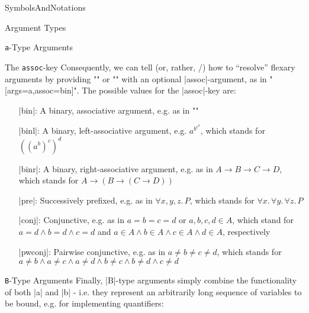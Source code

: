 \begin{smodule}[ns=https://github.com/slatex/sTeX/doc]{SymbolsAndNotations}
\begin{sfragment}{Argument Types}
\begin{sfragment}{\texttt a-Type Arguments}
\begin{sfragment}{The \texttt{assoc}-key}
            Consequently, we can tell \sTeX (or, rather, \mmt/\omdoc)
            how to ``resolve'' flexary arguments by providing
            \stexcode"\symdecl" or \stexcode"\symdef" with
            an optional |assoc|-argument, as in
            \stexcode"[args=a,assoc=bin]".
            The possible values for the |assoc|-key are:
            \begin{itemize}
                \item[|bin|:] A binary, associative argument, e.g.
                    as in \stexcode"\addition"
                \item[|binl|:] A binary, left-associative argument, e.g.
                    $a^{\scriptstyle b^{\scriptstyle c^d}}$, which stands for $((a^b)^c)^d$
                \item[|binr|:] A binary, right-associative argument,
                    e.g. as in $A\to B\to C\to D$, which stands
                    for $A \to (B \to (C \to D))$
                \item[|pre|:] Successively prefixed, e.g. as in
                    $\forall x,y,z.\,P$, which stands for
                    $\forall x.\, \forall y.\, \forall z.\,P$
                \item[|conj|:] Conjunctive, e.g. as in
                    $a=b=c=d$ or $a,b,c,d\in A$, which stand for
                    $a=d\wedge b=d\wedge c=d$ and $a\in A\wedge b\in A
                    \wedge c\in A\wedge d\in A$, respectively
                \item[|pwconj|:] Pairwise conjunctive, e.g. as in
                    $a\neq b\neq c\neq d$, which stands for
                    $a\neq b\wedge a\neq c\wedge a\neq d\wedge b\neq c\wedge b\neq d\wedge c\neq d$
            \end{itemize}
        \end{sfragment}

    \end{sfragment}
    
    \begin{sfragment}{\texttt B-Type Arguments}
        Finally, |B|-type arguments simply combine the functionality
        of both |a| and |b| - i.e. they represent an arbitrarily
        long sequence of variables to be bound, e.g. for implementing
        quantifiers:

    \end{sfragment}


\end{sfragment}
\end{smodule}
